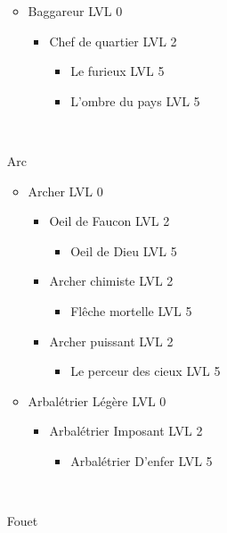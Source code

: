 \begin{itemize}
\begin{itemize}
\begin{itemize}
\begin{itemize}
						\end{itemize}
				\end{itemize}
			\item Baggareur LVL 0
				\begin{itemize}
					\item Chef de quartier LVL 2
						\begin{itemize}
							\item Le furieux LVL 5
							\item L'ombre du pays LVL 5
						\end{itemize}
				\end{itemize}
		\end{itemize}~\\
	\item[Arc] ~\\
		\begin{itemize}
			\item Archer LVL 0
				\begin{itemize}
					\item Oeil de Faucon LVL 2
						\begin{itemize}
							\item Oeil de Dieu LVL 5
						\end{itemize}
					\item Archer chimiste LVL 2
						\begin{itemize}
							\item Flêche mortelle LVL 5
						\end{itemize}
					\item Archer puissant LVL 2
						\begin{itemize}
							\item Le perceur des cieux LVL 5
						\end{itemize}
				\end{itemize}
			\item Arbalétrier Légère LVL 0
				\begin{itemize}
					\item Arbalétrier Imposant LVL 2
						\begin{itemize}
							\item Arbalétrier D'enfer LVL 5
						\end{itemize}
				\end{itemize}
		\end{itemize}~\\
	\item[Fouet] ~\\
		\begin{itemize}

\end{itemize}
\end{itemize}
